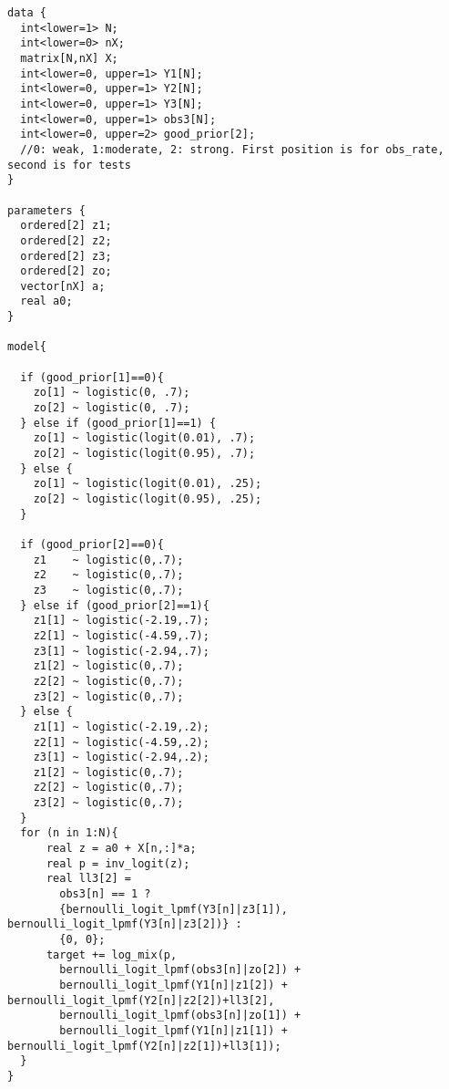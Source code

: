 \documentclass[
]{article}
\newenvironment{Shaded}{}{}
\begin{document}
\begin{Shaded}
\begin{verbatim}
data {
  int<lower=1> N;
  int<lower=0> nX;
  matrix[N,nX] X;
  int<lower=0, upper=1> Y1[N];
  int<lower=0, upper=1> Y2[N];
  int<lower=0, upper=1> Y3[N];
  int<lower=0, upper=1> obs3[N];
  int<lower=0, upper=2> good_prior[2]; 
  //0: weak, 1:moderate, 2: strong. First position is for obs_rate, second is for tests
}

parameters {
  ordered[2] z1;
  ordered[2] z2;
  ordered[2] z3;
  ordered[2] zo;
  vector[nX] a;
  real a0;
}

model{
  
  if (good_prior[1]==0){
    zo[1] ~ logistic(0, .7);
    zo[2] ~ logistic(0, .7);
  } else if (good_prior[1]==1) {
    zo[1] ~ logistic(logit(0.01), .7);
    zo[2] ~ logistic(logit(0.95), .7);
  } else {
    zo[1] ~ logistic(logit(0.01), .25);
    zo[2] ~ logistic(logit(0.95), .25);
  }
  
  if (good_prior[2]==0){
    z1    ~ logistic(0,.7);
    z2    ~ logistic(0,.7);
    z3    ~ logistic(0,.7);
  } else if (good_prior[2]==1){
    z1[1] ~ logistic(-2.19,.7);
    z2[1] ~ logistic(-4.59,.7);
    z3[1] ~ logistic(-2.94,.7);
    z1[2] ~ logistic(0,.7);
    z2[2] ~ logistic(0,.7);
    z3[2] ~ logistic(0,.7);
  } else {
    z1[1] ~ logistic(-2.19,.2);
    z2[1] ~ logistic(-4.59,.2);
    z3[1] ~ logistic(-2.94,.2);
    z1[2] ~ logistic(0,.7);
    z2[2] ~ logistic(0,.7);
    z3[2] ~ logistic(0,.7);
  }
  for (n in 1:N){
      real z = a0 + X[n,:]*a;
      real p = inv_logit(z);
      real ll3[2] = 
        obs3[n] == 1 ? 
        {bernoulli_logit_lpmf(Y3[n]|z3[1]), bernoulli_logit_lpmf(Y3[n]|z3[2])} :
        {0, 0};
      target += log_mix(p,
        bernoulli_logit_lpmf(obs3[n]|zo[2]) + 
        bernoulli_logit_lpmf(Y1[n]|z1[2]) + bernoulli_logit_lpmf(Y2[n]|z2[2])+ll3[2],
        bernoulli_logit_lpmf(obs3[n]|zo[1]) + 
        bernoulli_logit_lpmf(Y1[n]|z1[1]) + bernoulli_logit_lpmf(Y2[n]|z2[1])+ll3[1]);
  }
}
\end{verbatim}
\end{Shaded}
\end{document}
